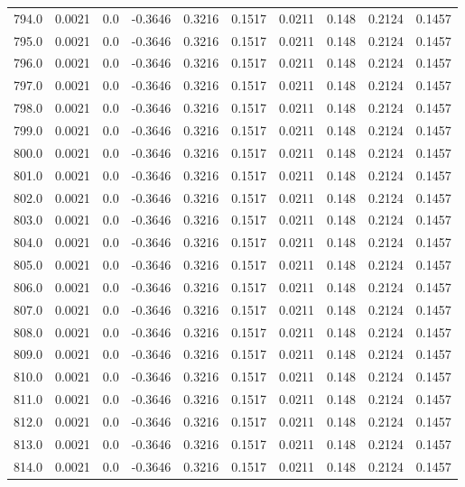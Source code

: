 \begin{longtable}{lrrrrrrrrr}
794.0 & 0.0021 & 0.0 & -0.3646 & 0.3216 & 0.1517 & 0.0211 & 0.148 & 0.2124 & 0.1457 \\
795.0 & 0.0021 & 0.0 & -0.3646 & 0.3216 & 0.1517 & 0.0211 & 0.148 & 0.2124 & 0.1457 \\
796.0 & 0.0021 & 0.0 & -0.3646 & 0.3216 & 0.1517 & 0.0211 & 0.148 & 0.2124 & 0.1457 \\
797.0 & 0.0021 & 0.0 & -0.3646 & 0.3216 & 0.1517 & 0.0211 & 0.148 & 0.2124 & 0.1457 \\
798.0 & 0.0021 & 0.0 & -0.3646 & 0.3216 & 0.1517 & 0.0211 & 0.148 & 0.2124 & 0.1457 \\
799.0 & 0.0021 & 0.0 & -0.3646 & 0.3216 & 0.1517 & 0.0211 & 0.148 & 0.2124 & 0.1457 \\
800.0 & 0.0021 & 0.0 & -0.3646 & 0.3216 & 0.1517 & 0.0211 & 0.148 & 0.2124 & 0.1457 \\
801.0 & 0.0021 & 0.0 & -0.3646 & 0.3216 & 0.1517 & 0.0211 & 0.148 & 0.2124 & 0.1457 \\
802.0 & 0.0021 & 0.0 & -0.3646 & 0.3216 & 0.1517 & 0.0211 & 0.148 & 0.2124 & 0.1457 \\
803.0 & 0.0021 & 0.0 & -0.3646 & 0.3216 & 0.1517 & 0.0211 & 0.148 & 0.2124 & 0.1457 \\
804.0 & 0.0021 & 0.0 & -0.3646 & 0.3216 & 0.1517 & 0.0211 & 0.148 & 0.2124 & 0.1457 \\
805.0 & 0.0021 & 0.0 & -0.3646 & 0.3216 & 0.1517 & 0.0211 & 0.148 & 0.2124 & 0.1457 \\
806.0 & 0.0021 & 0.0 & -0.3646 & 0.3216 & 0.1517 & 0.0211 & 0.148 & 0.2124 & 0.1457 \\
807.0 & 0.0021 & 0.0 & -0.3646 & 0.3216 & 0.1517 & 0.0211 & 0.148 & 0.2124 & 0.1457 \\
808.0 & 0.0021 & 0.0 & -0.3646 & 0.3216 & 0.1517 & 0.0211 & 0.148 & 0.2124 & 0.1457 \\
809.0 & 0.0021 & 0.0 & -0.3646 & 0.3216 & 0.1517 & 0.0211 & 0.148 & 0.2124 & 0.1457 \\
810.0 & 0.0021 & 0.0 & -0.3646 & 0.3216 & 0.1517 & 0.0211 & 0.148 & 0.2124 & 0.1457 \\
811.0 & 0.0021 & 0.0 & -0.3646 & 0.3216 & 0.1517 & 0.0211 & 0.148 & 0.2124 & 0.1457 \\
812.0 & 0.0021 & 0.0 & -0.3646 & 0.3216 & 0.1517 & 0.0211 & 0.148 & 0.2124 & 0.1457 \\
813.0 & 0.0021 & 0.0 & -0.3646 & 0.3216 & 0.1517 & 0.0211 & 0.148 & 0.2124 & 0.1457 \\
814.0 & 0.0021 & 0.0 & -0.3646 & 0.3216 & 0.1517 & 0.0211 & 0.148 & 0.2124 & 0.1457 \\

\end{longtable}
